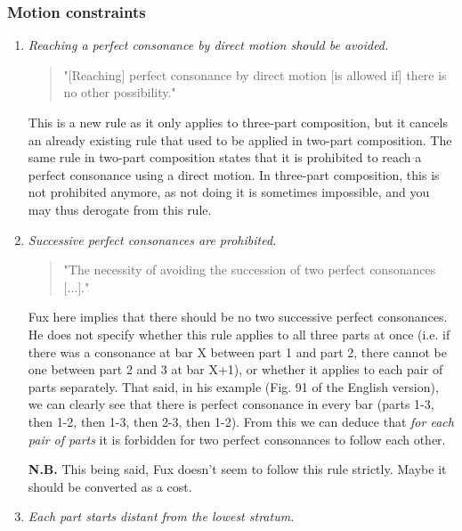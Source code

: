 \subsubsection{Motion constraints}
\begin{enumerate}[wide, label=\bfseries 1.P\arabic*]
    \item\label{rule:direct-to-p-cons} \reddot \textit{Reaching a perfect consonance by direct motion should be avoided.}

    \begin{quotation}
    "[Reaching] perfect consonance by direct motion [is allowed if] there is no other possibility."
    \textcite[p.77]{GaPEng}
    \end{quotation}

    This is a new rule as it only applies to three-part composition, but it cancels an already existing rule that used to be applied in two-part composition. The same rule in two-part composition states that it is prohibited to reach a perfect consonance using a direct motion. In three-part composition, this is not prohibited anymore, as not doing it is sometimes impossible, and you may thus derogate from this rule.

\setcounter{enumi}{3} %
    \item\label{rule:succ-p-cons} \reddot  \textit{Successive perfect consonances are prohibited.}

    \begin{quotation}
    "The necessity of avoiding the succession of two perfect consonances [...]."
    \textcite[p.72]{GaPEng}
    \end{quotation}

    Fux here implies that there should be no two successive perfect consonances. He does not specify whether this rule applies to all three parts at once (i.e. if there was a consonance at bar X between part 1 and part 2, there cannot be one between part 2 and 3 at bar X+1), or whether it applies to each pair of parts separately. That said, in his example (Fig. 91 of the English version), we can clearly see that there is perfect consonance in every bar (parts 1-3, then 1-2, then 1-3, then 2-3, then 1-2). From this we can deduce that \textit{for each pair of parts} it is forbidden for two perfect consonances to follow each other.

    \textbf{N.B.} This being said, Fux doesn't seem to follow this rule strictly. Maybe it should be converted as a cost. 
    
    \item\label{rule:start-distant} \reddot \textit{Each part starts distant from the lowest stratum.}


\end{enumerate}
